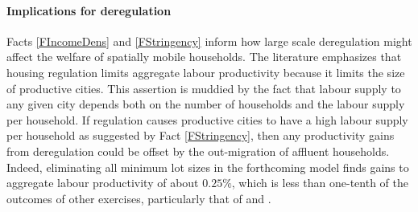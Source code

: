 \documentclass[12pt]{article}
\begin{document}
	
	
	\paragraph*{Implications for deregulation} Facts \ref{FIncomeDens} and \ref{FStringency} inform how large scale deregulation might affect the welfare of spatially mobile households. The literature emphasizes that housing regulation limits aggregate labour productivity because it limits the size of productive cities. This assertion is muddied by the fact that labour supply to any given city depends both on the number of households and the labour supply per household. If regulation causes productive cities to have a high labour supply per household as suggested by Fact \ref{FStringency}, then any productivity gains from deregulation could be offset by the out-migration of affluent households. Indeed, eliminating all minimum lot sizes in the forthcoming model finds gains to aggregate labour productivity of about $0.25 \%$, which is less than one-tenth of the outcomes of other exercises, particularly that of \cite{hseihmoretti} and \cite{durantonpugaurbgrowth}.  
	
\end{document}
